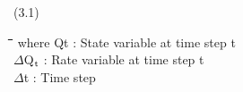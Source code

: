 \documentclass[11pt]{article}
\begin{document}
 \bigskip
\strut\hfill (3.1)
\nwln
\begin{tabbing}
\hspace{1.27cm}\=\hspace{1.27cm}\=\hspace{1.27cm}\=\hspace{1.27cm}\=%
\hspace{1.27cm}\=\hspace{1.27cm}\=\hspace{1.27cm}\=\hspace{1.27cm}\=%
\hspace{1.27cm}\=\hspace{1.27cm}\=\kill
where\> \> Qt\> : State variable at time step t\> \> \> \> \> \> \> [unit]\\
\>\> $\Delta$Q$_{{\rm t}}$\> : Rate variable at time step t\> \> \> \> \> \> \> [unit d$^{{\rm -1}}$]\\
\>\> $\Delta$t\> : Time step\> \> \> \> \> \> \> [d]
\end{tabbing}
\end{document}
